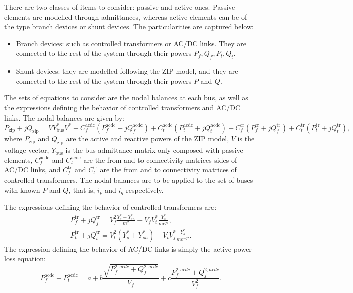 \documentclass[11pt]{article}
\begin{document}
There are two classes of items to consider: passive and active ones. Passive elements are modelled through admittances, whereas active elements can be of the type branch devices or shunt devices. The particularities are captured below:
\begin{itemize}
	\item Branch devices: such as controlled transformers or AC/DC links. They are connected to the rest of the system through their powers $P_f, Q_f, P_t, Q_t$. 
	\item Shunt devices: they are modelled following the ZIP model, and they are connected to the rest of the system through their powers $P$ and $Q$.
\end{itemize}
The sets of equations to consider are the nodal balances at each bus, as well as the expressions defining the behavior of controlled transformers and AC/DC links. The nodal balances are given by:
\begin{equation}
	P_\text{zip}+jQ_\text{zip} = VY^*_\text{bus}V^* + C_f^\text{acdc}(P^\text{acdc}_f + jQ^\text{acdc}_f) + C_t^\text{acdc}(P^\text{acdc}_t + jQ^\text{acdc}_t) + C_f^\text{tr}(P^\text{tr}_f + jQ^\text{tr}_f) + C_t^\text{tr}(P^\text{tr}_t + jQ^\text{tr}_t),
\end{equation}
where $P_\text{zip}$ and $Q_\text{zip}$ are the active and reactive powers of the ZIP model, $V$ is the voltage vector, $Y_\text{bus}$ is the bus admittance matrix only composed with passive elements, $C_f^\text{acdc}$ and $C_t^\text{acdc}$ are the from and to connectivity matrices sides of AC/DC links, and $C_f^\text{tr}$ and $C_t^\text{tr}$ are the from and to connectivity matrices of controlled transformers. The nodal balances are to be applied to the set of buses with known $P$ and $Q$, that is, ${i}_p$ and ${i}_q$ respectively.

The expressions defining the behavior of controlled transformers are:
\begin{equation}
	\begin{aligned}
		P_f^\text{tr} + jQ_f^\text{tr} = V_f^2 \frac{Y_s^* + Y_{sh}^*}{m^2} - V_fV_t^*\frac{Y_s^*}{me^{j\tau}}, \\
		P_t^\text{tr} + jQ_t^\text{tr} = V_t^2 (Y_s^* + Y_{sh}^*) - V_tV_f^*\frac{Y_s^*}{me^{-j\tau}}.
	\end{aligned}
\end{equation}
The expression defining the behavior of AC/DC links is simply the active power loss equation:
\begin{equation}
	P_f^\text{acdc} + P_t^\text{acdc} = a + b\frac{\sqrt{P_f^{2,acdc} + Q_f^{2,acdc}}}{V_f} + c\frac{P_f^{2,acdc} + Q_f^{2,acdc}}{V_f^2}.	
\end{equation}
\end{document}
